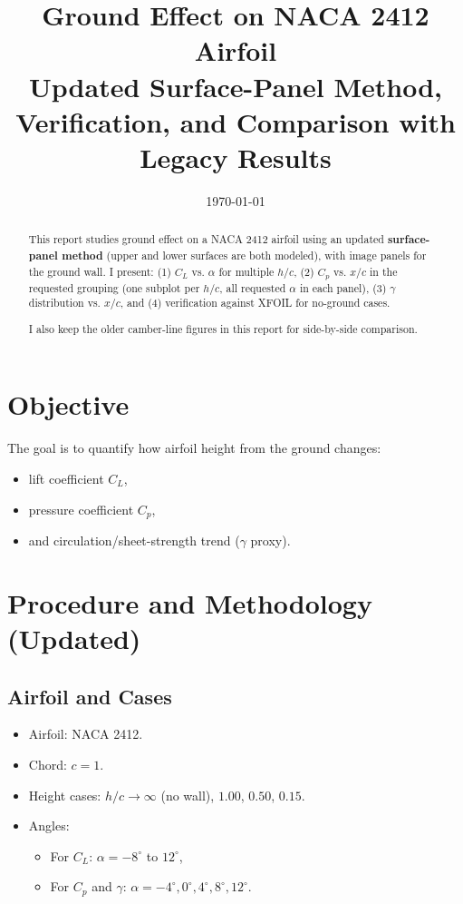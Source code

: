 \documentclass[11pt]{article}
\title{Ground Effect on NACA 2412 Airfoil\\
\large Updated Surface-Panel Method, Verification, and Comparison with Legacy Results}
\author{}
\date{\today}
\begin{document}
\maketitle

\begin{abstract}
This report studies ground effect on a NACA 2412 airfoil using an updated \textbf{surface-panel method} (upper and lower surfaces are both modeled), with image panels for the ground wall. I present:
(1) $C_L$ vs. $\alpha$ for multiple $h/c$,
(2) $C_p$ vs. $x/c$ in the requested grouping (one subplot per $h/c$, all requested $\alpha$ in each panel),
(3) $\gamma$ distribution vs. $x/c$,
and (4) verification against XFOIL for no-ground cases.

I also keep the older camber-line figures in this report for side-by-side comparison.
\end{abstract}

\section{Objective}
The goal is to quantify how airfoil height from the ground changes:
\begin{itemize}
  \item lift coefficient $C_L$,
  \item pressure coefficient $C_p$,
  \item and circulation/sheet-strength trend ($\gamma$ proxy).
\end{itemize}

\section{Procedure and Methodology (Updated)}
\subsection{Airfoil and Cases}
\begin{itemize}
  \item Airfoil: NACA 2412.
  \item Chord: $c = 1$.
  \item Height cases: $h/c \to \infty$ (no wall), $1.00$, $0.50$, $0.15$.
  \item Angles:
  \begin{itemize}
    \item For $C_L$: $\alpha=-8^\circ$ to $12^\circ$,
    \item For $C_p$ and $\gamma$: $\alpha=-4^\circ,0^\circ,4^\circ,8^\circ,12^\circ$.
  \end{itemize}
\end{itemize}
\end{document}

